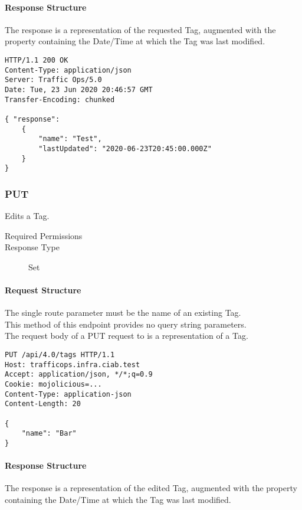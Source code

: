 \paragraph{Response Structure}
The response is a representation of the requested Tag, augmented with the
 property containing the Date/Time at which the Tag was last
modified.

\begin{codelisting}
\begin{verbatim}
HTTP/1.1 200 OK
Content-Type: application/json
Server: Traffic Ops/5.0
Date: Tue, 23 Jun 2020 20:46:57 GMT
Transfer-Encoding: chunked

{ "response":
	{
		"name": "Test",
		"lastUpdated": "2020-06-23T20:45:00.000Z"
	}
}
\end{verbatim}
\end{codelisting}

\subsubsection{PUT}
Edits a Tag.
\begin{description}
	\item[Required Permissions] 
	\item[Response Type] Set
\end{description}

\paragraph{Request Structure}
The single route parameter  must be the name of an existing
Tag.\\
This method of this endpoint provides no query string parameters.\\
The request body of a PUT request to  is a
representation of a Tag.

\begin{codelisting}
\begin{verbatim}
PUT /api/4.0/tags HTTP/1.1
Host: trafficops.infra.ciab.test
Accept: application/json, */*;q=0.9
Cookie: mojolicious=...
Content-Type: application-json
Content-Length: 20

{
	"name": "Bar"
}
\end{verbatim}
\end{codelisting}

\paragraph{Response Structure}
The response is a representation of the edited Tag, augmented with the
 property containing the Date/Time at which the Tag was last
modified.

